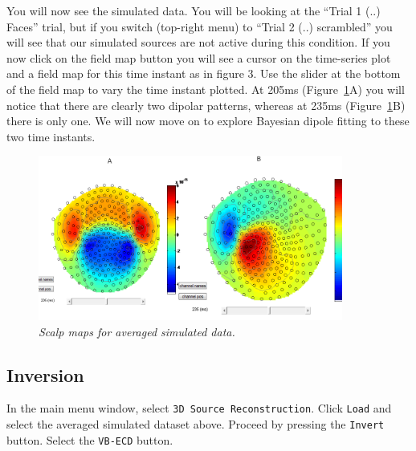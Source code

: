 You will now see the simulated data. You will be looking at the ``Trial 1 (..) Faces'' trial,  but if you switch (top-right menu) to ``Trial 2 (..) scrambled'' you will see that our simulated sources are not active during this condition.  If you now click on the field map button you will see a cursor on the time-series plot and a field map for this time instant as in figure 3. Use the slider at the bottom of the field map to vary the time instant plotted. At 205ms (Figure~\ref{meg_sloc:fig:14}A) you will notice that there are clearly two dipolar patterns, whereas at 235ms (Figure~\ref{meg_sloc:fig:14}B) there is only one.
We will now move on to explore Bayesian dipole fitting to these two time instants.

\begin{figure}
\begin{center}
\includegraphics[width=100mm]{meg_sloc/slide14}
\caption{\em Scalp maps for averaged simulated data.\label{meg_sloc:fig:14}}
\end{center}
\end{figure}

\subsection{Inversion}
In the main menu window, select \texttt{3D Source Reconstruction}. Click \texttt{Load} and select the averaged simulated dataset above.
Proceed by pressing the \texttt{Invert} button. Select the \texttt{VB-ECD} button.

